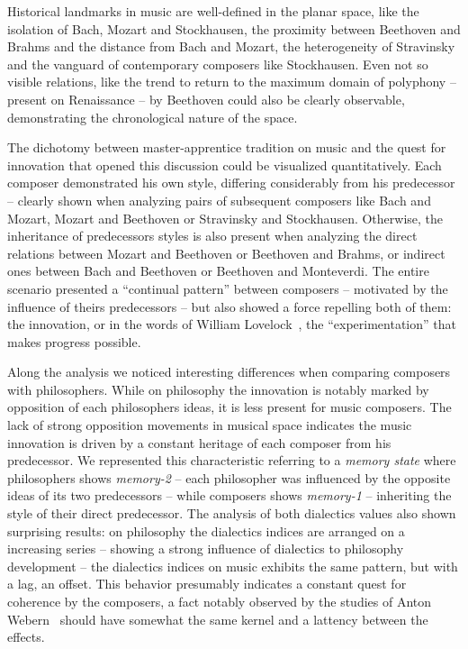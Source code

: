 \documentclass[
 aip,
 jmp,
 amsmath,amssymb,
 reprint,
]{revtex4-1}
\begin{document}
Historical landmarks in music are
well-defined in the planar space, like the isolation of Bach, Mozart
and Stockhausen, the
proximity between Beethoven and Brahms and the distance from Bach and Mozart, the heterogeneity of
Stravinsky and the vanguard of contemporary composers
like Stockhausen. Even not so visible relations, like the trend to return to the
maximum domain of polyphony -- present on Renaissance -- by Beethoven
could also be clearly observable, demonstrating the chronological nature of the
space. 

The dichotomy between
master-apprentice tradition on music and the quest for innovation that
opened this discussion could be visualized quantitatively. Each
composer demonstrated his own style, differing considerably from his
predecessor -- clearly shown when analyzing pairs of subsequent composers like
Bach and Mozart, Mozart and Beethoven or Stravinsky and
Stockhausen. Otherwise, the inheritance of predecessors styles is also
present when analyzing the direct relations between Mozart and
Beethoven or Beethoven and
Brahms, or indirect ones between Bach and Beethoven
or Beethoven and Monteverdi. The entire scenario presented
a ``continual pattern'' between
composers -- motivated by the influence of theirs predecessors -- but also showed a force
repelling both of them: the innovation, or in the words of William
Lovelock~\cite{Lovelock}, the ``experimentation'' that makes progress possible.

Along the analysis we noticed interesting differences when comparing
composers with philosophers. While on philosophy the
innovation is notably marked by opposition of each philosophers ideas,
it is less present for music composers. The lack of strong %
opposition movements in musical space indicates the music innovation is driven by
a constant heritage of each composer from his predecessor. We
represented this characteristic referring to a \textit{memory state}
where philosophers shows \textit{memory-2} -- each philosopher was
influenced by the opposite ideas of its two predecessors -- while
composers shows \textit{memory-1} -- inheriting the style of their direct
predecessor. 
The
analysis of both dialectics values also shown surprising
results: on philosophy the dialectics indices are arranged on a
increasing series -- showing a strong influence of
dialectics to philosophy development -- the dialectics indices on
music exhibits the same pattern, but with a lag, an offset. This behavior presumably indicates a
constant quest for coherence by the composers, a fact notably observed by
the studies of Anton Webern~\cite{Webern} should have somewhat the same
kernel and a lattency between the effects.
\end{document}
